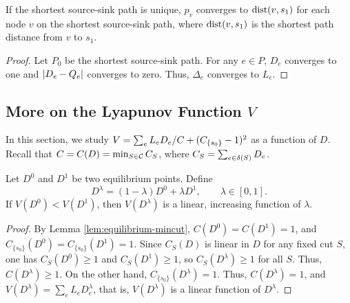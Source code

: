 \documentclass[11pt,a4paper]{article}
\renewcommand{\sink}{\ensuremath{s_1}}
\def\mycapa_#1(#2){C_{#2}(#1)}
\begin{document}
\begin{lemma}\label{lem: potentials in G0} If the shortest source-sink path is
unique, $p_v$ converges to $\dist(v,\sink)$ for each node $v$ on the shortest
source-sink path, where $\dist(v,\sink)$ is the shortest path distance from $v$ to $\sink$. \end{lemma}
\begin{proof} Let $P_0$ be the shortest source-sink path. For any $e \in P$,
$D_e$ converges to one and $| D_e - Q_e |$ converges to zero. Thus, $\Delta_e$
converges to $L_e$. \end{proof}






\subsection{More on the Lyapunov Function $V$}
In this section, we study $V = \sum_e L_e D_e / C + (\capa(\{s_0\})-1)^2$ as a function of $D$. Recall that $C=C(D) = \min_{S \in \calC} \capa(S)$, where $\capa(S) = \sum_{e \in \delta(S)} D_e$. 

\begin{lemma}
Let $D^0$ and $D^1$ be two equilibrium points. Define 
$$ D^\lambda = (1-\lambda) D^0 + \lambda D^1, \qquad \lambda \in [0,1] .$$ 
If $V(D^{0}) < V(D^{1})$, then $V(D^\lambda)$ is a linear, increasing function of $\lambda$. 
\end{lemma}
\begin{proof}
By Lemma \ref{lem:equilibrium-mincut}, $C(D^0) = C(D^1) = 1$, and
$\mycapa_{D^0}(\{s_0\})=\mycapa_{D^1}(\{s_0\})=1$. Since $\mycapa_D(S)$ is
linear in $D$ for any fixed cut $S$, one has $\mycapa_{D^0}(S) \ge 1$ and
$\mycapa_{D^1}(S) \ge 1$, so $\mycapa_{D^\lambda}(S) \ge 1$ for all $S$. Thus,
$C(D^\lambda) \ge 1$.  
On the other hand, $\mycapa_{D^\lambda}(\{s_0\})=1$. Thus, $C(D^\lambda) = 1$,
and $V(D^\lambda) = \sum_e L_e D_e^\lambda$, that is, $V(D^\lambda)$ is a
linear function of $D^\lambda$.   
\end{proof}
\end{document}

